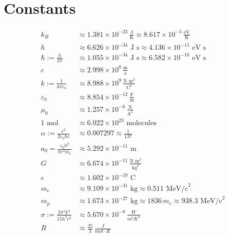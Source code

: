 \documentclass[12pt]{article}
\begin{document}
\section{Constants}
\begin{align*}
    k_B &\approx 1.381 \times 10^{-23} \, \frac{\text{J}}{\text{K}} \approx 8.617 \times 10^{-5} \, \frac{\text{eV}}{\text{K}} \\
    h &\approx 6.626 \times 10^{-34} \text{ J s} \approx 4.136 \times 10^{-15} \text{ eV s} \\
\hbar := \frac{h}{2 \pi} &\approx 1.055 \times 10^{-34} \text{ J s} \approx 6.582 \times 10^{-16} \text{ eV s} \\
    c &\approx 2.998 \times 10^8 \, \frac{\text{m}}{\text{s}} \\
    k := \frac{1}{4 \pi \varepsilon_0} &\approx 8.988 \times 10^9 \, \frac{\text{N m}^2}{\text{C}^2} \\
    \varepsilon_0 &\approx 8.854 \times 10^{-12} \, \frac{\text{F}}{\text{m}} \\
    \mu_0 &\approx 1.257 \times 10^{-6} \, \frac{\text{N}}{\text{A}^2} \\
    1 \text{ mol} &\approx 6.022 \times 10^{23} \text{ molecules} \\
    \alpha := \frac{e^2}{2 \varepsilon_0 h c} &\approx 0.007297 \approx \frac{1}{137} \\
    a_0 = \frac{\varepsilon_0 h^2}{\pi e^2 m_e} &\approx 5.292 \times 10^{-11} \text{ m} \\
    G &\approx 6.674 \times 10^{-11} \, \frac{\text{N m}^2}{\text{kg}^2} \\
    e &\approx 1.602 \times 10^{-19} \text{ C} \\
    m_e &\approx 9.109 \times 10^{-31} \text{ kg} \approx 0.511 \text{ MeV/c}^2 \\
    m_p &\approx 1.673 \times 10^{-27} \text{ kg} \approx 1836 \, m_e \approx 938.3 \text{ MeV/c}^2 \\
    \sigma := \frac{2 \pi^5 k^4}{15 h^3 c^2} &\approx 5.670 \times 10^{-8} \, \frac{W}{m^2K^4} \\
    R &\approx \frac{25}{3} \, \frac{J}{mol \cdot K} \\
\end{align*}
\end{document}
